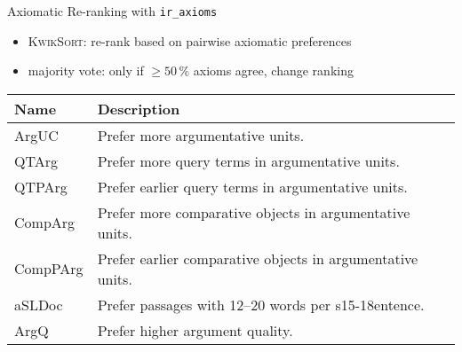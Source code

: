 \documentclass[english]{mlutalk}
\begin{document}
\begin{frame}{Axiomatic Re-ranking with \texttt{\large ir\_axioms}~\cite{BondarenkoFRSVH2022}}
  \begin{itemize}
    \item \textsc{KwikSort}: re-rank based on pairwise axiomatic preferences
    \item majority vote: only if \(\geq 50\,\%\) axioms agree, change ranking
  \end{itemize}
  \begin{table}
    \renewcommand{\tabcolsep}{0.2em}
    \begin{tabularx}{\linewidth}{@{}lX@{}}
      \toprule
      \textbf{Name} & \textbf{Description} \\
      \midrule
      ArgUC~\cite{BondarenkoHVSPB2018} & Prefer more argumentative units. \\
      QTArg~\cite{BondarenkoHVSPB2018} & Prefer more query terms in argumentative units. \\
      QTPArg~\cite{BondarenkoHVSPB2018} & Prefer earlier query terms in argumentative units. \\
      CompArg & Prefer more comparative objects in argumentative units. \\
      CompPArg& Prefer earlier comparative objects in argumentative units. \\
      aSLDoc~\cite{BondarenkoFKHVS2019} & Prefer passages with 12--20 words per s15-18entence. \\
      ArgQ & Prefer higher argument quality. \\ 
      \bottomrule
    \end{tabularx}
  \end{table}
\end{frame}
\end{document}
